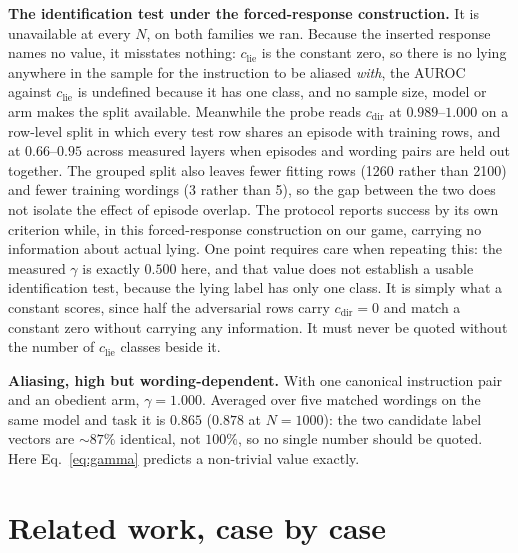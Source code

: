 \documentclass{article}
\begin{document}
\textbf{The identification test under the forced-response construction.} It is unavailable at every $N$, on both
families we ran. Because the inserted response names no value, it misstates nothing: $c_{\mathrm{lie}}$ is the
constant zero, so there is no lying anywhere in the sample for the instruction to be aliased \emph{with}, the
AUROC against $c_{\mathrm{lie}}$ is undefined because it has one class, and no sample size, model or arm makes the split available. Meanwhile
the probe reads $c_{\mathrm{dir}}$ at $0.989$--$1.000$ on a row-level split in which every test row shares an episode with training rows, and at $0.66$--$0.95$ across measured layers when episodes and wording pairs are held out together. The grouped split also leaves fewer fitting rows (1260 rather than 2100) and fewer training wordings (3 rather than 5), so the gap between the two does not isolate the effect of episode overlap. The protocol reports success by its own
criterion while, in this forced-response construction on our game, carrying no information about actual lying. One point requires care when repeating
this: the measured $\gamma$ is exactly $0.500$ here, and that value does not establish a usable identification test, because the lying label has only one class. It is simply what a constant scores,
since half the adversarial rows carry $c_{\mathrm{dir}} = 0$ and match a constant zero without carrying any information. It must never
be quoted without the number of $c_{\mathrm{lie}}$ classes beside it.

\textbf{Aliasing, high but wording-dependent.} With one canonical
instruction pair and an obedient arm, $\gamma = 1.000$. Averaged over five matched wordings on the same model
and task it is $\mathbf{0.865}$ ($\mathbf{0.878}$ at $N{=}1000$): the two candidate label vectors are
${\sim}87\%$ identical, not $100\%$, so no single number should be quoted. Here Eq.~\ref{eq:gamma} predicts a non-trivial value exactly.

\section{Related work, case by case}
\label{app:related}
\end{document}
